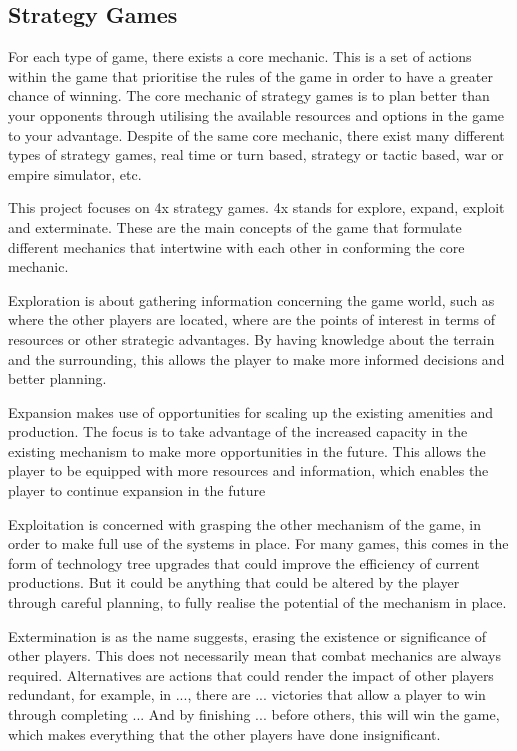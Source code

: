 \label{Strategy_Games}

\subsection*{Strategy Games}

For each type of game, there exists a core mechanic. This is a set of actions within the game that prioritise the rules of the game in order to have a greater chance of winning. The core mechanic of strategy games is to plan better than your opponents through utilising the available resources and options in the game to your advantage. Despite of the same core mechanic, there exist many different types of strategy games, real time or turn based, strategy or tactic based, war or empire simulator, etc. 

This project focuses on 4x strategy games. 4x stands for explore, expand, exploit and exterminate. These are the main concepts of the game that formulate different mechanics that intertwine with each other in conforming the core mechanic.


Exploration is about gathering information concerning the game world, such as where the other players are located, where are the points of interest in terms of resources or other strategic advantages. By having knowledge about the terrain and the surrounding, this allows the player to make more informed decisions and better planning.

Expansion makes use of opportunities for scaling up the existing amenities and production. The focus is to take advantage of the increased capacity in the existing mechanism to make more opportunities in the future. This allows the player to be equipped with more resources and information, which enables the player to continue expansion in the future

Exploitation is concerned with grasping the other mechanism of the game, in order to make full use of the systems in place. For many games, this comes in the form of technology tree upgrades that could improve the efficiency of current productions. But it could be anything that could be altered by the player through careful planning, to fully realise the potential of the mechanism in place. 

Extermination is as the name suggests, erasing the existence or significance of other players. This does not necessarily mean that combat mechanics are always required. Alternatives are actions that could render the impact of other players redundant, for example, in ..., there are ... victories that allow a player to win through completing ... And by finishing ... before others, this will win the game, which makes everything that the other players have done insignificant.  

